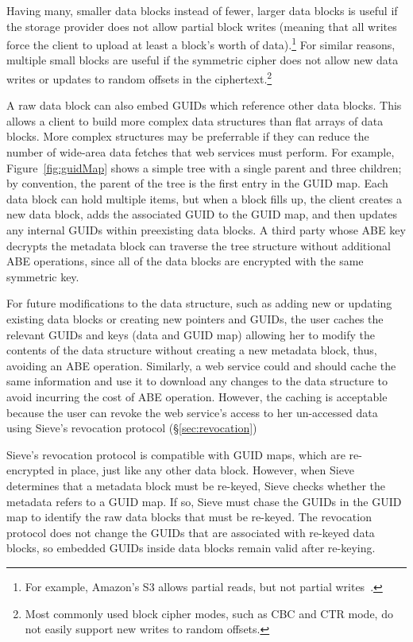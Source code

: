 Having many, smaller data blocks instead of
fewer, larger data blocks is useful if the
storage provider does not allow partial block
writes (meaning that all writes force the
client to upload at least a block's worth of
data).\footnote{For example, Amazon's S3
allows partial reads, but not partial writes~\cite{AmazonPUT}.} %
For similar reasons, multiple small blocks
are useful if the symmetric cipher does
not allow new data writes or 
updates to random offsets in the
ciphertext.\footnote{Most commonly used 
block cipher modes, such as CBC and CTR mode,
do not easily support new writes to random offsets.}

A raw data block can also embed GUIDs which
reference other data blocks. This allows
a client to build more complex data structures
than flat arrays of data blocks.
More complex structures may be preferrable
if they can reduce the number of wide-area
data fetches that web services must perform.
For example, Figure~\ref{fig:guidMap} shows
a simple tree with a single parent and three
children; by convention, the parent of the
tree is the first entry in the GUID map. Each
data block can hold multiple items, but when
a block fills up, the client creates a new
data block, adds the associated GUID to
the GUID map, and then updates any internal
GUIDs within preexisting data blocks. A third
party whose ABE key decrypts the metadata block
can traverse the tree structure without
additional ABE operations, since all of the
data blocks are encrypted with the same
symmetric key. 

For future modifications to the data structure,
such as adding new or updating existing data
blocks or creating new pointers and GUIDs,
the user caches the relevant GUIDs and keys
(data and GUID map) allowing her to modify
the contents of the data structure without
creating a new metadata block, thus,
avoiding an ABE operation. Similarly, a web
service could and should cache the same information
and use it to download any changes to the data 
structure to avoid incurring the cost of ABE 
operation. However, the caching is acceptable
because the user can revoke the web service's
access to her un-accessed data using Sieve's
revocation protocol (\S\ref{sec:revocation})

Sieve's revocation protocol
is compatible with GUID maps, which are re-encrypted
in place, just like any other data block. However,
when Sieve determines that a metadata block must
be re-keyed, Sieve checks whether the metadata
refers to a GUID map. If so, Sieve must chase
the GUIDs in the GUID map to identify the
raw data blocks that must be re-keyed. The revocation
protocol does not change the GUIDs that are
associated with re-keyed data blocks, so embedded
GUIDs inside data blocks remain valid after
re-keying.

